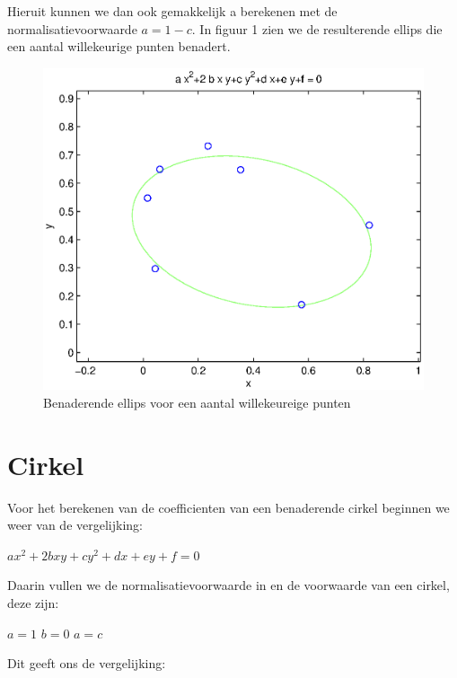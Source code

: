 \documentclass[]{article}
\begin{document}
\noindent Hieruit kunnen we dan ook gemakkelijk a berekenen met de normalisatievoorwaarde $a = 1-c$. In figuur 1 zien we de resulterende ellips die een aantal willekeurige punten benadert.
\\
\begin{figure}[h]
\begin{center}
\includegraphics[width=1\textwidth]{ellips.eps}
\end{center}
\caption{Benaderende ellips voor een aantal willekeureige punten}
\end{figure}



\section*{Cirkel}
\noindent Voor het berekenen van de coefficienten van een benaderende cirkel beginnen we weer van de vergelijking:

 \begin{center}
 $ax^2 +2bxy + cy^2 + dx +  ey + f = 0$
 \end{center}
Daarin vullen we de normalisatievoorwaarde in en de voorwaarde van een cirkel, deze zijn:

 \begin{center}
 $ a = 1$	   \quad \quad \quad      	$b = 0$    \quad \quad \quad   	$a = c$
 \end{center}
 
 \noindent Dit geeft ons de vergelijking:
 
\end{document}

